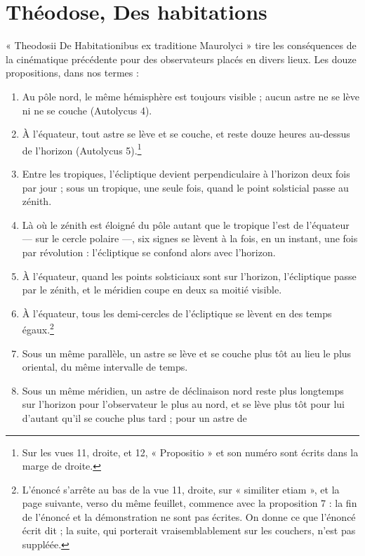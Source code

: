 \documentclass[11pt,a4paper]{article}
\begin{document}
\section*{Théodose, Des habitations}

« Theodosii De Habitationibus ex traditione Maurolyci » tire les conséquences
de la cinématique précédente pour des observateurs placés en divers lieux. Les
douze propositions, dans nos termes :

\begin{enumerate}
  \item[1.] Au pôle nord, le même hémisphère est toujours visible ; aucun astre
    ne se lève ni ne se couche (Autolycus 4).
  \item[2.] À l'équateur, tout astre se lève et se couche, et reste douze heures
    au-dessus de l'horizon (Autolycus 5).\footnote{Sur les vues 11, droite, et
    12, « Propositio » et son numéro sont écrits dans la marge de droite.}
  \item[3.] Entre les tropiques, l'écliptique devient perpendiculaire à
    l'horizon deux fois par jour ; sous un tropique, une seule fois, quand le
    point solsticial passe au zénith.
  \item[4.] Là où le zénith est éloigné du pôle autant que le tropique l'est de
    l'équateur — sur le cercle polaire —, six signes se lèvent à la fois, en un
    instant, une fois par révolution : l'écliptique se confond alors avec
    l'horizon.
  \item[5.] À l'équateur, quand les points solsticiaux sont sur l'horizon,
    l'écliptique passe par le zénith, et le méridien coupe en deux sa moitié
    visible.
  \item[6.] À l'équateur, tous les demi-cercles de l'écliptique se lèvent en des
    temps égaux.\footnote{L'énoncé s'arrête au bas de la vue 11, droite, sur
    « similiter etiam », et la page suivante, verso du même feuillet, commence
    avec la proposition 7 : la fin de l'énoncé et la démonstration ne sont pas
    écrites. On donne ce que l'énoncé écrit dit ; la suite, qui porterait
    vraisemblablement sur les couchers, n'est pas suppléée.}
  \item[7.] Sous un même parallèle, un astre se lève et se couche plus tôt au
    lieu le plus oriental, du même intervalle de temps.
  \item[8.] Sous un même méridien, un astre de déclinaison nord reste plus
    longtemps sur l'horizon pour l'observateur le plus au nord, et se lève plus
    tôt pour lui d'autant qu'il se couche plus tard ; pour un astre de

\end{enumerate}
\end{document}
